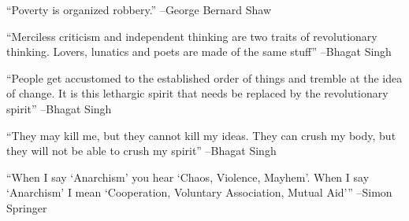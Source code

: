 \documentclass{article}%
\begin{document}
\linebreak%
\vspace{1mm}%
\begin{minipage}{\textwidth}%
\flushleft%
“Poverty is organized robbery.”%
\linebreak%
\vspace{1mm}%
–George Bernard Shaw%
\linebreak%
\vspace{1mm}%
\end{minipage}%
\linebreak%
\vspace{1mm}%
\begin{minipage}{\textwidth}%
\flushleft%
“Merciless criticism and independent thinking are two traits of revolutionary thinking. Lovers, lunatics and poets are made of the same stuff”%
\linebreak%
\vspace{1mm}%
–Bhagat Singh%
\linebreak%
\vspace{1mm}%
\end{minipage}%
\linebreak%
\vspace{1mm}%
\begin{minipage}{\textwidth}%
\flushleft%
“People get accustomed to the established order of things and tremble at the idea of change. It is this lethargic spirit that needs be replaced by the revolutionary spirit”%
\linebreak%
\vspace{1mm}%
–Bhagat Singh%
\linebreak%
\vspace{1mm}%
\end{minipage}%
\linebreak%
\vspace{1mm}%
\begin{minipage}{\textwidth}%
\flushleft%
“They may kill me, but they cannot kill my ideas. They can crush my body, but they will not be able to crush my spirit”%
\linebreak%
\vspace{1mm}%
–Bhagat Singh%
\linebreak%
\vspace{1mm}%
\end{minipage}%
\linebreak%
\vspace{1mm}%
\begin{minipage}{\textwidth}%
\flushleft%
“When I say ‘Anarchism’ you hear ‘Chaos, Violence, Mayhem’. When I say ‘Anarchism’ I mean ‘Cooperation, Voluntary Association, Mutual Aid’”%
\linebreak%
\vspace{1mm}%
–Simon Springer%
\linebreak%
\vspace{1mm}%
\end{minipage}%
\end{document}
